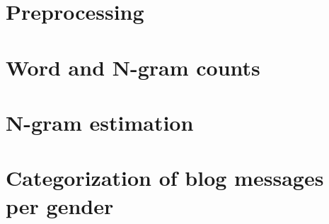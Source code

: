 \documentclass{eplDoc}
\begin{document}
\maketitle
\newpage
\addtocounter{section}{1}
\section{Preprocessing}

\section{Word and N-gram counts}

\section{N-gram estimation}

\section{Categorization of blog messages per gender}
\end{document}
